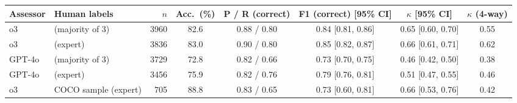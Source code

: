\begin{tabular}{ll r c c c c c}
\toprule
Assessor & Human labels & $n$ & Acc.\ (\%) & P / R (correct) & F1 (correct) [95\% CI] & $\kappa$ [95\% CI] & $\kappa$ (4-way)\\
\midrule
o3 & \itot{} (majority of 3) & 3960 & 82.6 & 0.88 / 0.80 & 0.84 [0.81, 0.86] & 0.65 [0.60, 0.70] & 0.55 \\
o3 & \ttoi{} (expert) & 3836 & 83.0 & 0.90 / 0.80 & 0.85 [0.82, 0.87] & 0.66 [0.61, 0.71] & 0.62 \\
GPT-4o & \itot{} (majority of 3) & 3729 & 72.8 & 0.82 / 0.66 & 0.73 [0.70, 0.75] & 0.46 [0.42, 0.50] & 0.38 \\
GPT-4o & \ttoi{} (expert) & 3456 & 75.9 & 0.82 / 0.76 & 0.79 [0.76, 0.81] & 0.51 [0.47, 0.55] & 0.46 \\
o3 & COCO sample (expert) & 705 & 88.8 & 0.83 / 0.65 & 0.73 [0.60, 0.81] & 0.66 [0.53, 0.76] & 0.42 \\
\bottomrule
\end{tabular}
